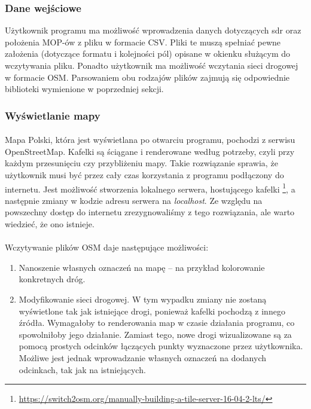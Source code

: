 \subsubsection{Dane wejściowe}
Użytkownik programu ma możliwość wprowadzenia danych dotyczących \acrshort{sdr}
oraz położenia MOP-ów z pliku w formacie CSV. Pliki te muszą spełniać pewne
założenia (dotyczące formatu i kolejności pól) opisane w okienku służącym do
wczytywania pliku. Ponadto użytkownik ma możliwość wczytania sieci drogowej w
formacie OSM. Parsowaniem obu rodzajów plików zajmują się odpowiednie
biblioteki wymienione w poprzedniej sekcji.
\subsubsection{Wyświetlanie mapy}
\paragraph{} 
Mapa Polski, która jest wyświetlana po otwarciu programu, pochodzi z
serwisu \mbox{OpenStreetMap}. Kafelki są ściągane i renderowane według potrzeby, czyli
przy każdym przesunięciu czy przybliżeniu mapy. Takie rozwiązanie sprawia, że
użytkownik musi być przez cały czas korzystania z programu podłączony
do internetu. Jest możliwość stworzenia lokalnego serwera, hostującego
kafelki
\footnote{\url{https://switch2osm.org/manually-building-a-tile-server-16-04-2-lts/}}, a
następnie zmiany w kodzie adresu serwera na \textit{localhost}. Ze względu na
powszechny dostęp do internetu zrezygnowaliśmy z tego rozwiązania, ale warto
wiedzieć, że ono istnieje. 
\paragraph{}
Wczytywanie plików OSM daje następujące możliwości:
\begin{enumerate}
  \item Nanoszenie własnych oznaczeń na mapę -- na przykład kolorowanie
    konkretnych dróg.
  \item Modyfikowanie sieci drogowej. W tym wypadku zmiany nie zostaną
    wyświetlone tak jak istniejące drogi, ponieważ kafelki pochodzą z innego
    źródła. Wymagałoby to renderowania map w czasie działania programu, co
    spowolniłoby jego działanie. Zamiast tego, nowe drogi wizualizowane są
    za pomocą prostych odcinków łączących punkty wyznaczone przez użytkownika. 
    Możliwe jest jednak wprowadzanie własnych oznaczeń na dodanych
    odcinkach, tak jak na istniejących. 
\end{enumerate}

